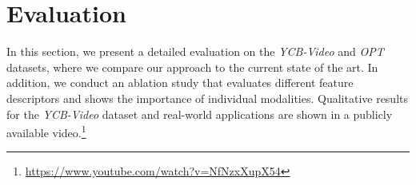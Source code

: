\documentclass[letterpaper, 10 pt, conference]{ieeeconf}
\begin{document}
 


\section{Evaluation}\label{sec:e}

In this section, we present a detailed evaluation on the \textit{YCB-Video} \cite{Xiang2018} and \textit{OPT} \cite{Wu2017} datasets, where we compare our approach to the current state of the art.
In addition, we conduct an ablation study that evaluates different feature descriptors and shows the importance of individual modalities.
Qualitative results for the \textit{YCB-Video} dataset and real-world applications are shown in a publicly available video.\footnote{\url{https://www.youtube.com/watch?v=NfNzxXupX54}}
\end{document}
